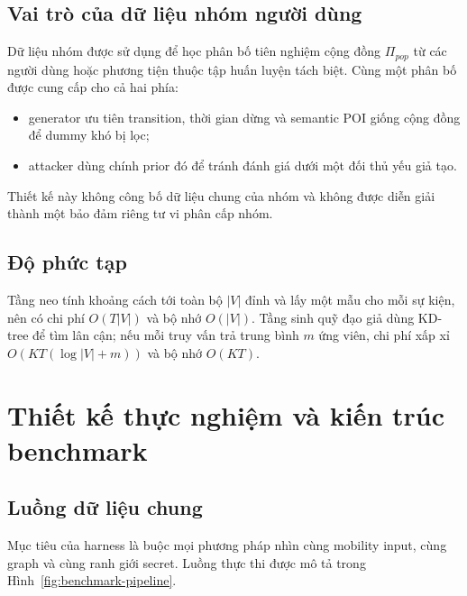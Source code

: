 \documentclass[12pt,a4paper,oneside]{report}
\begin{document}
\section{Vai trò của dữ liệu nhóm người dùng}

Dữ liệu nhóm được sử dụng để học phân bố tiên nghiệm cộng đồng $\Pi_{pop}$ từ các người dùng hoặc phương tiện thuộc tập huấn luyện tách biệt. Cùng một phân bố được cung cấp cho cả hai phía:

\begin{itemize}
  \item generator ưu tiên transition, thời gian dừng và semantic POI giống cộng đồng để dummy khó bị lọc;
  \item attacker dùng chính prior đó để tránh đánh giá dưới một đối thủ yếu giả tạo.
\end{itemize}

Thiết kế này không công bố dữ liệu chung của nhóm và không được diễn giải thành một bảo đảm riêng tư vi phân cấp nhóm.

\section{Độ phức tạp}

Tầng neo tính khoảng cách tới toàn bộ $|V|$ đỉnh và lấy một mẫu cho mỗi sự kiện, nên có chi phí $O(T|V|)$ và bộ nhớ $O(|V|)$. Tầng sinh quỹ đạo giả dùng KD-tree để tìm lân cận; nếu mỗi truy vấn trả trung bình $m$ ứng viên, chi phí xấp xỉ $O(KT(\log|V|+m))$ và bộ nhớ $O(KT)$.

\chapter{Thiết kế thực nghiệm và kiến trúc benchmark}
\label{ch:experiment}

\section{Luồng dữ liệu chung}

Mục tiêu của harness là buộc mọi phương pháp nhìn cùng mobility input, cùng graph và cùng ranh giới secret. Luồng thực thi được mô tả trong Hình~\ref{fig:benchmark-pipeline}.
\end{document}
